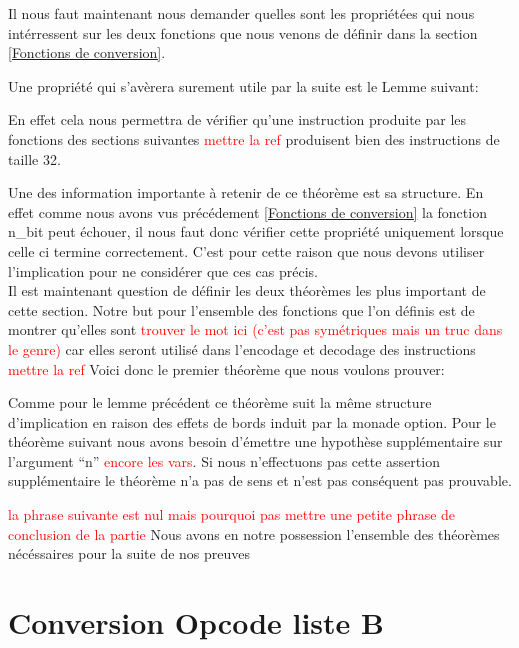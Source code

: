 \documentclass {article}
\newcommand{\codefrom}[3]
           {}
\theoremstyle{definition}
\theoremstyle{remark}
\newcommand{\todo}[1]{\textcolor{red}{#1}}
\begin{document}
Il nous faut maintenant nous demander quelles sont les propriétées qui nous intérressent sur
les deux fonctions que nous venons de définir dans la section \ref{Fonctions de conversion}.

Une propriété qui s'avèrera surement utile par la suite est le Lemme suivant:

En effet cela nous permettra de vérifier qu'une instruction produite par les fonctions
des sections suivantes \todo{mettre la ref} produisent bien des instructions de taille 32.

\codefrom{src}{binary}{size_n_bit}

Une des information importante à retenir de ce théorème est sa structure.
En effet comme nous avons vus précédement \ref{Fonctions de conversion} la
fonction n\_bit peut échouer, il nous faut donc vérifier cette propriété
uniquement lorsque celle ci termine correctement. C'est pour cette raison
que nous devons utiliser l'implication pour ne considérer que ces cas précis. \\

Il est maintenant question de définir les deux théorèmes les plus important de
cette section. Notre but pour l'ensemble des fonctions que l'on définis est de
montrer qu'elles sont \todo{trouver le mot ici (c'est pas symétriques mais un truc dans le genre)}
car elles seront utilisé dans l'encodage et decodage des instructions \todo{mettre la ref}
Voici donc le premier théorème que nous voulons prouver:

\codefrom{src}{binary}{nbitn}

Comme pour le lemme précédent ce théorème suit la même structure d'implication en raison des effets
de bords induit par la monade option.
Pour le théorème suivant nous avons besoin d'émettre une hypothèse supplémentaire sur l'argument
``n'' \todo{encore les vars}. Si nous n'effectuons pas cette assertion supplémentaire le
théorème n'a pas de sens et n'est pas conséquent pas prouvable.

\codefrom{src}{binary}{bitnbit}

\todo{la phrase suivante est nul mais pourquoi pas mettre une petite phrase de conclusion de la partie}
Nous avons en notre possession l'ensemble des théorèmes nécéssaires pour la suite de nos preuves




\section{Conversion Opcode liste B}
\label{partieOpcode}
\end{document}
